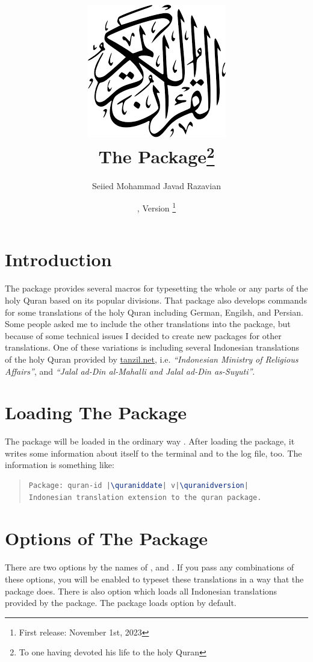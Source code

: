 \documentclass[a4paper]{ltxdoc}
\title{\includegraphics[scale=.3]{quran.png}\\
The \xpackage{quran-id} Package\footnote{To one having devoted his life to the holy Quran}\\
}
\author{Seiied Mohammad Javad Razavian\\\xemail{javadr@gmail.com}}
\date{\quraniddate,  Version \quranidversion\footnote{First release: November 1st, 2023}}
\begin{document}
\maketitle

\tableofcontents

\section{Introduction}
The  package provides several macros for
typesetting the whole or any parts of the holy Quran based on its popular divisions. That package also develops
commands for some translations of the holy Quran including German, Engilsh, and Persian.
Some people asked me to include the other translations into the  package,
but because of some technical issues I decided to create new packages for other translations.
One of these variations is  including several Indonesian translations of the holy Quran
provided by \url{tanzil.net}, i.e. \emph{``Indonesian Ministry of Religious Affairs''},
and \emph{``Jalal ad-Din al-Mahalli and Jalal ad-Din as-Suyuti''}.


\section{Loading The Package}
The package will be loaded in the ordinary way
.
After loading the package, it writes some information about itself to the
terminal and to the log file, too. The information is something like:

\begin{quote}
\begin{lstlisting}[style=BashInputStyle, language=tex, escapechar={|}]
Package: quran-id |\quraniddate| v|\quranidversion|
Indonesian translation extension to the quran package.
\end{lstlisting}
\end{quote}


\section{Options of The Package}\label{sec:qurantypesetting}
There are two options by the names of , and .
If you pass any combinations of these options, you will be enabled to typeset these translations in a way
that the  package does.
There is also  option which loads all Indonesian translations provided by the  package.
The package loads  option by default.
\end{document}
